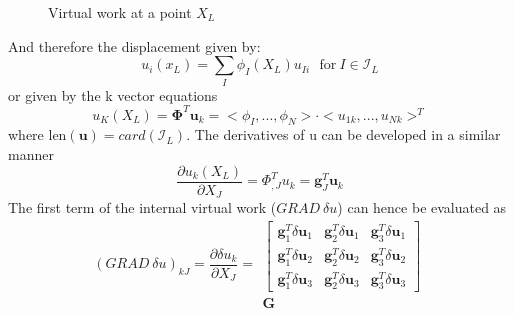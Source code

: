 \begin{figure}
	\centering
	\caption{Virtual work at a point $X_L$}
\end{figure}
\noindent And therefore the displacement given by:
\begin{equation}
u_i(x_L) = \sum_I \phi_I(X_L) u_{Ii} ~~~ \text{for}~I \in \mathcal{I}_L 
\end{equation}
or given by the k vector equations
\begin{equation}
{u_K(X_L)} = \mathbf{\Phi}^T\mathbf{u}_k =  <\phi_I,...,\phi_N>\cdot <u_{1k},...,u_{Nk}>^T
\end{equation}
where $\text{len}(\mathbf{u}) =  card(\mathcal{I}_L)$. The derivatives of u can be developed in a similar manner
\begin{equation}
\frac{\partial u_k(X_L) }{\partial X_J} = \Phi_{,J}^T u_k = \mathbf{g}^T_J \mathbf{u}_k
\end{equation}
The first term of the internal virtual work ($GRAD ~\delta u$) can hence be evaluated as 
\begin{equation}
(GRAD~ \delta u)_{kJ} = \frac{\partial \delta u_k}{\partial  X_J} = \begin{array}{c} \begin{bmatrix}
\mathbf{g}_1^T \delta \mathbf{u}_1       & \mathbf{g}_2^T \delta \mathbf{u}_1 & \mathbf{g}_3^T \delta \mathbf{u}_1   \\
\mathbf{g}_1^T \delta \mathbf{u}_2       & \mathbf{g}_2^T \delta \mathbf{u}_2 & \mathbf{g}_3^T \delta \mathbf{u}_2     \\
\mathbf{g}_1^T \delta \mathbf{u}_3       & \mathbf{g}_2^T \delta \mathbf{u}_3 & \mathbf{g}_3^T \delta \mathbf{u}_3
\end{bmatrix}\\
\mathbf{G}
\end{array}
\end{equation}
